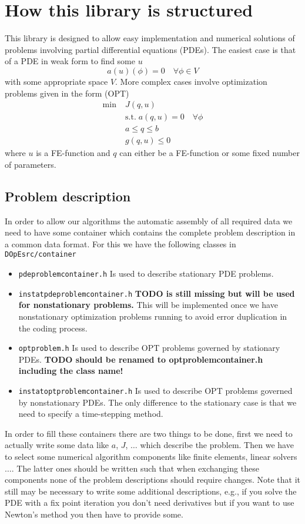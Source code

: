 \section{How this library is structured}
This library is designed to allow easy implementation and numerical solutions 
of problems involving partial differential equations (PDEs). The easiest case 
is that of a PDE in weak form to find some $u$
\[
a(u)(\phi) = 0 \quad \forall \phi \in V
\]
with some appropriate space $V$.
More complex cases involve optimization problems given in the form (OPT)
\begin{align*}
\min\;&J(q,u) \\
  &\text{s.t.}\; a(q,u) = 0 \quad \forall \phi\\
  &a \le q \le b\\
  &g(q,u) \le 0  
\end{align*}
where $u$ is a FE-function and $q$ can either be a FE-function or some 
fixed number of parameters.

\subsection{Problem description}
In order to allow our algorithms the automatic assembly of all required 
data we need to have some container which contains the complete problem 
description in a common data format. For this we have the following 
classes in {\tt DOpEsrc/container}
\begin{itemize}
  \item {\tt pdeproblemcontainer.h} Is used to describe  stationary PDE problems.
  \item {\tt instatpdeproblemcontainer.h} {\bf TODO is still missing but will be used for nonstationary problems.} This will be implemented once we have nonstationary optimization problems running to avoid error duplication in the coding process.
  \item {\tt optproblem.h} Is used to describe  OPT problems governed by 
    stationary PDEs. {\bf TODO should be renamed to optproblemcontainer.h including the class name!}
  \item {\tt instatoptproblemcontainer.h} Is used to describe  OPT problems governed by nonstationary PDEs. The only difference to the stationary case is that we need to specify a time-stepping method.  
\end{itemize}
In order to fill these containers there are two things to be done,
first we need to actually write some data like $a$, $J$, $\ldots$
which describe the problem. Then we have to select some numerical 
algorithm components like finite elements, linear solvers $\ldots$.
The latter ones should be written such that when exchanging these components
none of the problem descriptions should require changes. 
Note that it still may be necessary to write some additional descriptions, 
e.g., if you solve the PDE with a fix point iteration you don't need derivatives
but if you want to use Newton's method you then have to provide some.


